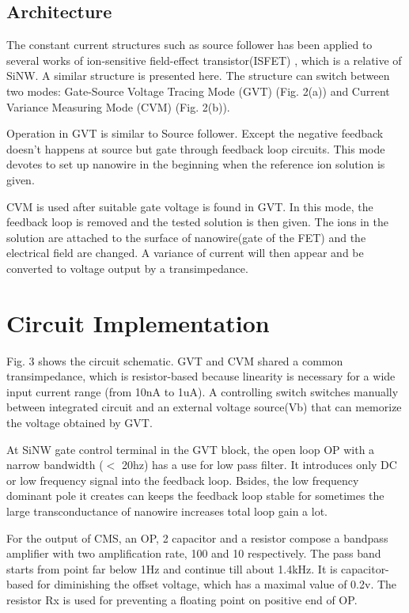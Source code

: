 \documentclass{article}
\begin{document}
\subsection{Architecture}
The constant current structures such as source follower has been applied to several works of ion-sensitive field-effect transistor(ISFET) \cite{J6}, which is a relative of SiNW.
A similar structure is presented here. The structure can switch between two modes: Gate-Source Voltage Tracing Mode (GVT) (Fig. 2(a)) and Current Variance Measuring Mode (CVM) (Fig. 2(b)).

Operation in GVT is similar to Source follower.
Except the negative feedback doesn’t happens at source but gate through feedback loop circuits.
This mode devotes to set up nanowire in the beginning when the reference ion solution is given.

CVM is used after suitable gate voltage is found in GVT.
In this mode, the feedback loop is removed and the tested solution is then given.
The ions in the solution are attached to the surface of nanowire(gate of the FET) and the electrical field are changed.
A variance of current will then appear and be converted to voltage output by a transimpedance.


\section{Circuit Implementation}
Fig. 3 shows the circuit schematic.
GVT and CVM shared a common transimpedance, which is resistor-based because linearity is necessary for a wide input current range (from 10nA to 1uA).
A controlling switch switches manually between integrated circuit and an external voltage source(Vb) that can memorize the voltage obtained by GVT.

At SiNW gate control terminal in the GVT block, the open loop OP with a narrow bandwidth ($<$ 20hz) has a use for low pass filter.
It introduces only DC or low frequency signal into the feedback loop.
Bsides, the low frequency dominant pole it creates can keeps the feedback loop stable for sometimes the large transconductance of nanowire increases total loop gain a lot.

For the output of CMS, an OP, 2 capacitor and a resistor compose a bandpass amplifier with two amplification rate, 100 and 10 respectively.
The pass band starts from point far below 1Hz and continue till about 1.4kHz.
It is capacitor-based for diminishing the offset voltage, which has a maximal value of 0.2v.
The resistor Rx is used for preventing a floating point on positive end of OP.
\end{document}
